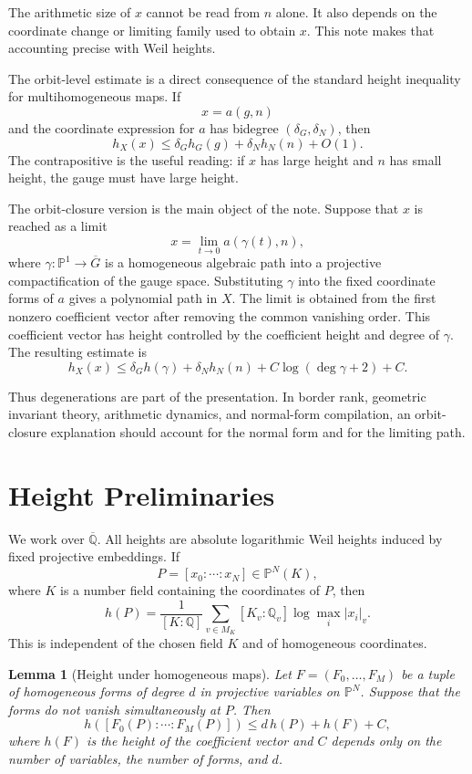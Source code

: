 \documentclass[11pt]{article}
\newtheorem{lemma}[theorem]{Lemma}
\begin{document}
The arithmetic size of \(x\) cannot be read from \(n\) alone. It also depends on the coordinate change or limiting family used to obtain \(x\). This note makes that accounting precise with Weil heights.

The orbit-level estimate is a direct consequence of the standard height inequality for multihomogeneous maps. If
\[
x=a(g,n)
\]
and the coordinate expression for \(a\) has bidegree \((\delta_G,\delta_N)\), then
\[
h_X(x)\leq \delta_G h_G(g)+\delta_N h_N(n)+O(1).
\]
The contrapositive is the useful reading: if \(x\) has large height and \(n\) has small height, the gauge must have large height.

The orbit-closure version is the main object of the note. Suppose that \(x\) is reached as a limit
\[
x=\lim_{t\to0}a(\gamma(t),n),
\]
where \(\gamma:\mathbb P^1\to \overline G\) is a homogeneous algebraic path into a projective compactification of the gauge space. Substituting \(\gamma\) into the fixed coordinate forms of \(a\) gives a polynomial path in \(X\). The limit is obtained from the first nonzero coefficient vector after removing the common vanishing order. This coefficient vector has height controlled by the coefficient height and degree of \(\gamma\). The resulting estimate is
\[
h_X(x)\leq
\delta_G h(\gamma)+\delta_N h_N(n)+C\log(\deg\gamma+2)+C.
\]

Thus degenerations are part of the presentation. In border rank, geometric invariant theory, arithmetic dynamics, and normal-form compilation, an orbit-closure explanation should account for the normal form and for the limiting path.

\section{Height Preliminaries}

We work over \(\overline{\mathbb Q}\). All heights are absolute logarithmic Weil heights induced by fixed projective embeddings. If
\[
P=[x_0:\cdots:x_N]\in\mathbb P^N(K),
\]
where \(K\) is a number field containing the coordinates of \(P\), then
\[
h(P)=
\frac{1}{[K:\mathbb Q]}
\sum_{v\in M_K}[K_v:\mathbb Q_v]\log\max_i|x_i|_v.
\]
This is independent of the chosen field \(K\) and of homogeneous coordinates.

\begin{lemma}[Height under homogeneous maps]
Let \(F=(F_0,\ldots,F_M)\) be a tuple of homogeneous forms of degree \(d\) in projective variables on \(\mathbb P^N\). Suppose that the forms do not vanish simultaneously at \(P\). Then
\[
h([F_0(P):\cdots:F_M(P)])
\leq d\,h(P)+h(F)+C,
\]
where \(h(F)\) is the height of the coefficient vector and \(C\) depends only on the number of variables, the number of forms, and \(d\).
\end{lemma}
\end{document}
